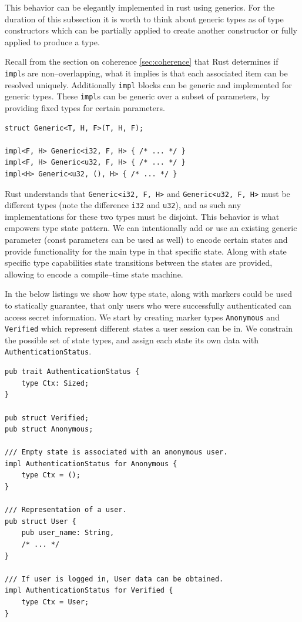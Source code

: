 This behavior can be elegantly implemented in rust using generics.
For the duration of this subsection it is worth to think about generic types as of type constructors which can be partially applied to create another constructor or fully applied to produce a type.

Recall from the section on coherence \ref{sec:coherence} that Rust determines if \texttt{impl}s are non--overlapping, what it implies is that each associated item can be resolved uniquely.
Additionally \texttt{impl} blocks can be generic and implemented for generic types. These \texttt{impl}s can be generic over a subset of parameters, 
by providing fixed types for certain parameters.

\begin{lstlisting}
struct Generic<T, H, F>(T, H, F);

impl<F, H> Generic<i32, F, H> { /* ... */ }
impl<F, H> Generic<u32, F, H> { /* ... */ }
impl<H> Generic<u32, (), H> { /* ... */ }
\end{lstlisting}

Rust understands that \texttt{Generic<i32, F, H>} and \texttt{Generic<u32, F, H>} must be different types (note the difference \texttt{i32} and \texttt{u32}),
and as such any implementations for these two types must be disjoint.
This behavior is what empowers type state pattern. We can intentionally add or use an existing generic parameter (const parameters can be used as well)
to encode certain states and provide functionality for the main type in that specific state. Along with state specific type capabilities state transitions between the states are provided,
allowing to encode a compile--time state machine.

In the below listings we show how type state, along with markers could be used to statically guarantee, that only users who were successfully authenticated
can access secret information. We start by creating marker types \texttt{Anonymous} and \texttt{Verified} which represent different states a user session can be in.
We constrain the possible set of state types, and assign each state its own data with \texttt{AuthenticationStatus}.

\begin{lstlisting}
pub trait AuthenticationStatus {
    type Ctx: Sized;
}

pub struct Verified;
pub struct Anonymous;

/// Empty state is associated with an anonymous user.
impl AuthenticationStatus for Anonymous {
    type Ctx = ();
}

/// Representation of a user.
pub struct User {
    pub user_name: String,
    /* ... */
}

/// If user is logged in, User data can be obtained.
impl AuthenticationStatus for Verified {
    type Ctx = User;
}
\end{lstlisting}

